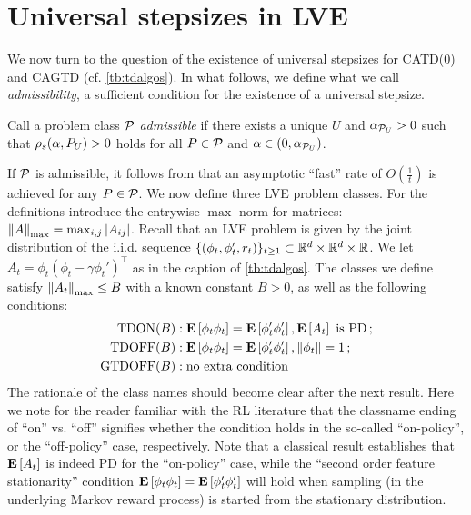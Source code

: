 \section{Universal stepsizes in LVE}\label{sec:rl}
We now turn to the question of the existence of universal stepsizes for CATD(0) and CAGTD (cf. \cref{tb:tdalgos}). 
In what follows, we define what we call \emph{admissibility}, 
a sufficient condition for the existence of a universal stepsize. 
\begin{definition}\label{def:admis}
Call a problem class $\P$ \emph{admissible} if there exists a unique $U$ and $\alpha_{\P_U}>0$ such that
$\rhos{P_U}>0$ holds for all $P\in \P$ and $\alpha\in(0,\alpha_{\P_U})$.
\end{definition}
If $\P$ is admissible, it  follows from  that an asymptotic ``fast'' rate of $O(\frac1t)$ is achieved for any $P\in \cP$. 
We now define three LVE problem classes. For the definitions introduce
the entrywise $\max$-norm for matrices: $\norm{A}_{\max} = \max_{i,j} |A_{ij}|$.
Recall that an LVE problem is given by the joint distribution of the i.i.d. sequence
$\{(\phi_t,\phi_t',r_t)\}_{t\ge 1}\subset \R^d\times \R^d \times \R$. We let 
$A_t = \phi_t(\phi_t - \gamma \phi_t')^\top$ as in the caption of \cref{tb:tdalgos}.
The classes we define satisfy $\norm{A_t}_{\max}\le B$ with a known constant $B>0$, 
as well as the following conditions:
\begin{align*}
\text{TDON}(B)&: \EE{\phi_t\phi_t}=\EE{\phi'_t\phi'_t}, \EE{A_t} \text{ is PD}\,;\\
\text{TDOFF}(B)&: \EE{\phi_t\phi_t}=\EE{\phi'_t\phi'_t}, \norm{\phi_t}=1\,;\\
\text{GTDOFF}(B)&: \text{no extra condition}
\end{align*}
The rationale of the class names should become clear after the next result.
Here we note for the reader familiar with the RL literature that the classname ending of ``on'' vs. ``off'' signifies
whether the condition holds in the so-called ``on-policy'', or the ``off-policy'' case, respectively.
Note that a classical result establishes that $\EE{A_t}$ is indeed PD for the ``on-policy'' case, 
while the ``second order feature stationarity'' condition $ \EE{\phi_t\phi_t}=\EE{\phi'_t\phi'_t}$ will hold 
when sampling (in the underlying Markov reward process) 
is started from the stationary distribution. 
\FloatBarrier
